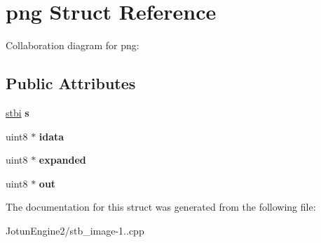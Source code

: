 \hypertarget{structpng}{\section{png Struct Reference}
\label{structpng}
}


Collaboration diagram for png\-:
\subsection*{Public Attributes}
\begin{DoxyCompactItemize}
\item 
\hypertarget{structpng_a95ebf389a681442b47ea0caabb1d5681}{\hyperlink{structstbi}{stbi} {\bfseries s}}\label{structpng_a95ebf389a681442b47ea0caabb1d5681}

\item 
\hypertarget{structpng_a5cd944fdf0f0417a344bcc538ed98ed6}{uint8 $\ast$ {\bfseries idata}}\label{structpng_a5cd944fdf0f0417a344bcc538ed98ed6}

\item 
\hypertarget{structpng_a474dd0da8ac0347924e68f5de7e68c55}{uint8 $\ast$ {\bfseries expanded}}\label{structpng_a474dd0da8ac0347924e68f5de7e68c55}

\item 
\hypertarget{structpng_ada33c39620ad9a647c088c40d21887f6}{uint8 $\ast$ {\bfseries out}}\label{structpng_ada33c39620ad9a647c088c40d21887f6}

\end{DoxyCompactItemize}


The documentation for this struct was generated from the following file\-:\begin{DoxyCompactItemize}
\item 
Jotun\-Engine2/stb\-\_\-image-\/1..\-cpp\end{DoxyCompactItemize}

